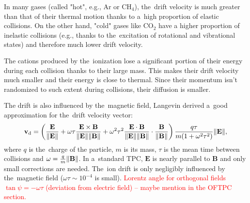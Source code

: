 			In many gases (called "hot", e.g., Ar or CH$_4$), the~drift velocity is much greater than that of their thermal motion thanks to a~high proportion of elastic collisions. On the other hand, "cold" gases like CO$_2$ have a higher proportion of inelastic collisions (e.g., thanks to the~excitation of rotational and vibrational states) and therefore much lower drift velocity.
			
			The cations produced by the~ionization lose a significant portion of their energy during each collision thanks to their large mass. This makes their drift velocity much smaller and their energy is close to thermal. Since their momentum isn't randomized to such extent during collisions, their diffusion is smaller.
			
			The drift is also influenced by the~magnetic field, Langevin derived a~good approximation for the~drift velocity vector:
				\begin{equation}
					\mathbf{v}_\text{d} = \left(\frac{\mathbf{E}}{\norm{\mathbf{E}}} + \omega\tau\frac{\mathbf{E}\times\mathbf{B}}{\norm{\mathbf{E}}\norm{\mathbf{B}}} + \omega^2\tau^2\frac{\mathbf{E}\cdot\mathbf{B}}{\norm{\mathbf{E}}\norm{\mathbf{B}}}\cdot \frac{\mathbf{B}}{\norm{\mathbf{B}}}\right) \frac{q\tau}{m(1+\omega^2\tau^2)}\norm{\mathbf{E}},
				\end{equation}
			where $q$ is the~charge of the particle, $m$ is its mass, $\tau$ is the mean time between collisions and $\omega = \frac{q}{m}\norm{\mathbf{B}}$. In a~standard \ac{TPC}, $\mathbf{E}$ is nearly parallel to $\mathbf{B}$ and only small corrections are needed. The~ion drift is only negligibly influenced by the~magnetic field ($\omega\tau\sim10^{-4}$ is small). \textcolor{red}{Lorentz angle for orthogonal fields $\tan\psi = -\omega\tau$ (deviation from electric field) -- maybe mention in the OFTPC section.}
